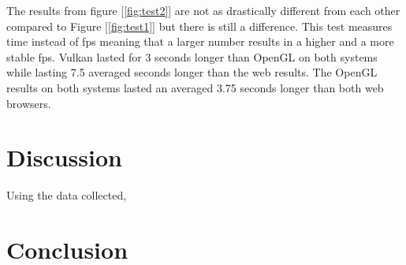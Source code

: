 \documentclass{article}
\begin{document}
The results from figure [\ref{fig:test2}] are not as drastically different from each other compared to Figure [\ref{fig:test1}] but there is still a difference. This test measures time instead of fps meaning that a larger number results in a higher and a more stable fps. Vulkan lasted for 3 seconds longer than OpenGL on both systems while lasting 7.5 averaged seconds longer than the web results. The OpenGL results on both systems lasted an averaged 3.75 seconds longer than both web browsers.

\section {Discussion}
Using the data collected,

\section {Conclusion}
\end{document}
